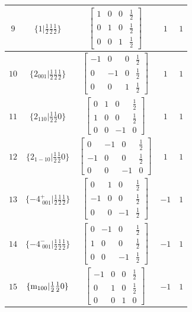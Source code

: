\documentclass[fleqn,8pt]{jsarticle}
\begin{document}
\begin{longtable}{ccccc}
$ 9 $ & $ \{1|\frac{1}{2} \frac{1}{2} \frac{1}{2}\} $ & $ \begin{bmatrix} 1 & 0 & 0 & \frac{1}{2} \\ 0 & 1 & 0 & \frac{1}{2} \\ 0 & 0 & 1 & \frac{1}{2} \end{bmatrix} $ & $ 1 $ & $ 1 $ \\ \hline
$ 10 $ & $ \{2{}_{001}|\frac{1}{2} \frac{1}{2} \frac{1}{2}\} $ & $ \begin{bmatrix} -1 & 0 & 0 & \frac{1}{2} \\ 0 & -1 & 0 & \frac{1}{2} \\ 0 & 0 & 1 & \frac{1}{2} \end{bmatrix} $ & $ 1 $ & $ 1 $ \\ \hline
$ 11 $ & $ \{2{}_{110}|\frac{1}{2} \frac{1}{2} 0\} $ & $ \begin{bmatrix} 0 & 1 & 0 & \frac{1}{2} \\ 1 & 0 & 0 & \frac{1}{2} \\ 0 & 0 & -1 & 0 \end{bmatrix} $ & $ 1 $ & $ 1 $ \\ \hline
$ 12 $ & $ \{2{}_{1-10}|\frac{1}{2} \frac{1}{2} 0\} $ & $ \begin{bmatrix} 0 & -1 & 0 & \frac{1}{2} \\ -1 & 0 & 0 & \frac{1}{2} \\ 0 & 0 & -1 & 0 \end{bmatrix} $ & $ 1 $ & $ 1 $ \\ \hline
$ 13 $ & $ \{-4^{+}_{\,\,001}|\frac{1}{2} \frac{1}{2} \frac{1}{2}\} $ & $ \begin{bmatrix} 0 & 1 & 0 & \frac{1}{2} \\ -1 & 0 & 0 & \frac{1}{2} \\ 0 & 0 & -1 & \frac{1}{2} \end{bmatrix} $ & $ -1 $ & $ 1 $ \\ \hline
$ 14 $ & $ \{-4^{-}_{\,\,001}|\frac{1}{2} \frac{1}{2} \frac{1}{2}\} $ & $ \begin{bmatrix} 0 & -1 & 0 & \frac{1}{2} \\ 1 & 0 & 0 & \frac{1}{2} \\ 0 & 0 & -1 & \frac{1}{2} \end{bmatrix} $ & $ -1 $ & $ 1 $ \\ \hline
$ 15 $ & $ \{{\rm m}_{100}|\frac{1}{2} \frac{1}{2} 0\} $ & $ \begin{bmatrix} -1 & 0 & 0 & \frac{1}{2} \\ 0 & 1 & 0 & \frac{1}{2} \\ 0 & 0 & 1 & 0 \end{bmatrix} $ & $ -1 $ & $ 1 $ \\ \hline

\end{longtable}
\end{document}

